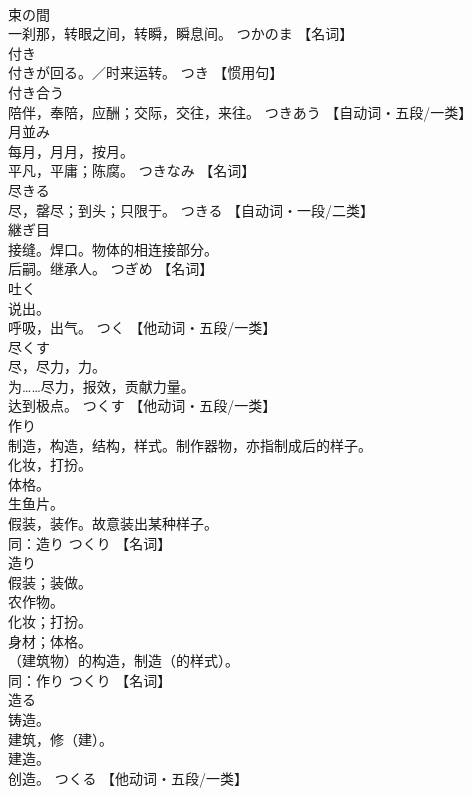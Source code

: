 \documentclass[8pt]{extreport}
\begin{document}
\begin{CJK}{UTF8}{min}
\\	束の間	
\\	一刹那，转眼之间，转瞬，瞬息间。	つかのま		【名词】
\\	付き	
\\	付きが回る。／时来运转。	つき		【惯用句】
\\	付き合う	
\\	陪伴，奉陪，应酬；交际，交往，来往。	つきあう		【自动词・五段/一类】
\\	月並み	
\\	每月，月月，按月。 
\\	平凡，平庸；陈腐。	つきなみ		【名词】
\\	尽きる	
\\	尽，罄尽；到头；只限于。	つきる		【自动词・一段/二类】
\\	継ぎ目	
\\	接缝。焊口。物体的相连接部分。 
\\	后嗣。继承人。	つぎめ		【名词】
\\	吐く	
\\	说出。 
\\	呼吸，出气。	つく		【他动词・五段/一类】
\\	尽くす	
\\	尽，尽力，力。 
\\	为……尽力，报效，贡献力量。 
\\	达到极点。	つくす		【他动词・五段/一类】
\\	作り	
\\	制造，构造，结构，样式。制作器物，亦指制成后的样子。 
\\	化妆，打扮。 
\\	体格。 
\\	生鱼片。 
\\	假装，装作。故意装出某种样子。 
\\	同：造り	つくり		【名词】
\\	造り	
\\	假装；装做。 
\\	农作物。 
\\	化妆；打扮。 
\\	身材；体格。 
\\	（建筑物）的构造，制造（的样式）。 
\\	同：作り	つくり		【名词】
\\	造る	
\\	铸造。 
\\	建筑，修（建）。 
\\	建造。 
\\	创造。	つくる		【他动词・五段/一类】

\end{CJK}
\end{document}
